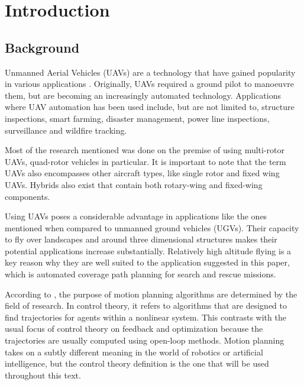 \chapter{Introduction}
\label{chp:intro}


\section{Background}
\label{sec:intro_bg}
Unmanned Aerial Vehicles (UAVs) are a technology that have gained popularity in various applications \cite{CPP-Survey-2019}. Originally, UAVs required a ground pilot to manoeuvre them, but are becoming an increasingly automated technology. Applications where UAV automation has been used include, but are not limited to, structure inspections\cite{Guerrero2013}, smart farming\cite{Lottes2017}, disaster management\cite{Maza2011}, power line inspections\cite{Chang2017}, surveillance\cite{Basilico2015} and wildfire tracking\cite{Pham2017}.

Most of the research mentioned was done on the premise of using multi-rotor UAVs, quad-rotor vehicles in particular. It is important to note that the term UAVs also encompasses other aircraft types, like single rotor and fixed wing UAVs. Hybrids also exist that contain both rotary-wing and fixed-wing components\cite{CPP-Survey-2019}.

Using UAVs poses a considerable advantage in applications like the ones mentioned when compared to unmanned ground vehicles (UGVs). Their capacity to fly over landscapes and around three dimensional structures makes their potential applications increase substantially. Relatively high altitude flying is a key reason why they are well suited to the application suggested in this paper, which is automated coverage path planning for search and rescue missions.

According to \cite{Lavalle2006}, the purpose of motion planning algorithms are determined by the field of research. In control theory, it refers to algorithms that are designed to find trajectories for agents within a nonlinear system. This contrasts with the usual focus of control theory on feedback and optimization because the trajectories are usually computed using open-loop methods. Motion planning takes on a subtly different meaning in the world of robotics or artificial intelligence, but the control theory definition is the one that will be used throughout this text. 

